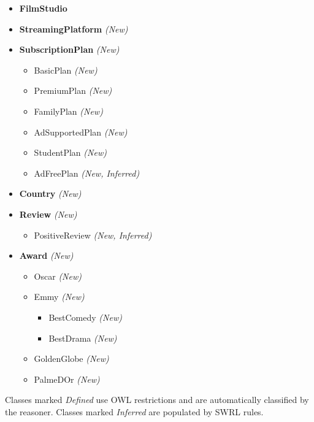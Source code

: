 \begin{itemize}
\begin{itemize}
\begin{itemize}
            \item Actor
            \begin{itemize}
                \item VoiceActor \textit{(New)}
            \end{itemize}
        \end{itemize}
        \item Subscriber \textit{(New)}
        \begin{itemize}
            \item AdultSubscriber \textit{(New, Inferred)}
            \item FullAccessSubscriber \textit{(New, Inferred)}
        \end{itemize}
    \end{itemize}
    \item \textbf{FilmStudio}
    \item \textbf{StreamingPlatform} \textit{(New)}
    \item \textbf{SubscriptionPlan} \textit{(New)}
    \begin{itemize}
        \item BasicPlan \textit{(New)}
        \item PremiumPlan \textit{(New)}
        \item FamilyPlan \textit{(New)}
        \item AdSupportedPlan \textit{(New)}
        \item StudentPlan \textit{(New)}
        \item AdFreePlan \textit{(New, Inferred)}
    \end{itemize}
    \item \textbf{Country} \textit{(New)}
    \item \textbf{Review} \textit{(New)}
    \begin{itemize}
        \item PositiveReview \textit{(New, Inferred)}
    \end{itemize}
    \item \textbf{Award} \textit{(New)}
    \begin{itemize}
        \item Oscar \textit{(New)}
        \item Emmy \textit{(New)}
        \begin{itemize}
            \item BestComedy \textit{(New)}
            \item BestDrama \textit{(New)}
        \end{itemize}
        \item GoldenGlobe \textit{(New)}
        \item PalmeDOr \textit{(New)}
    \end{itemize}
\end{itemize}

\vspace{0.3cm}
\noindent Classes marked \textit{Defined} use OWL restrictions and are automatically classified by the reasoner. Classes marked \textit{Inferred} are populated by SWRL rules.